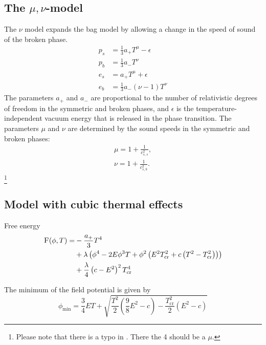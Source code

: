 \subsection{The $\mu,\nu$-model}
The $\nu$ model expands the bag model by allowing a change in the speed of sound of the broken phase.
\cites[eq. 15]{giese_2021}[eq. 38]{giese_2020}
\begin{align}
p_s &= \frac{1}{3} a_+ T^\mu - \epsilon \\
p_b &= \frac{1}{3} a_- T^\nu \\
e_s &= a_+ T^\mu + \epsilon \\
e_b &= \frac{1}{3} a_- (\nu - 1) T^\nu
\end{align}
The parameters $a_+$ and $a_-$ are proportional to the number of relativistic degrees of freedom in the symmetric and broken phases, and $\epsilon$ is the temperature-independent vacuum energy that is released in the phase transition.
The parameters $\mu$ and $\nu$ are determined by the sound speeds in the symmetric and broken phases:
\cites[eq. 16]{giese_2021}[eq. 39]{giese_2020}
\begin{align}
\mu = 1 + \frac{1}{c_{s,s}^2}, \\
\nu = 1 + \frac{1}{c_{s,b}^2}.
\end{align}
\footnote{Please note that there is a typo in \cite[eq. 15]{giese_2021}. There the 4 should be a $\mu$.}

\subsection{Model with cubic thermal effects}
Free energy
\cite[eq. 45]{giese_2020}
\begin{align}
\begin{split}
\textsc{F}(\phi, T) =
&- \frac{a_+}{3} T^4 \\
&+ \lambda \left( \phi^4 - 2E\phi^3 T + \phi^2 \left( E^2 T_\text{cr}^2 + c \left( T^2 - T_\text{cr}^2 \right) \right) \right) \\
&+ \frac{\lambda}{4} \left( c - E^2 \right)^2 T_\text{cr}^4
\end{split}
\end{align}

The minimum of the field potential is given by
\cite[eq. 46]{giese_2020}
\begin{equation}
\phi_\text{min} = \frac{3}{4} ET + \sqrt{\frac{T^2}{2}(\frac{9}{8}E^2 - c) - \frac{T_\text{cr}^2}{2} (E^2 - c)}
\end{equation}

